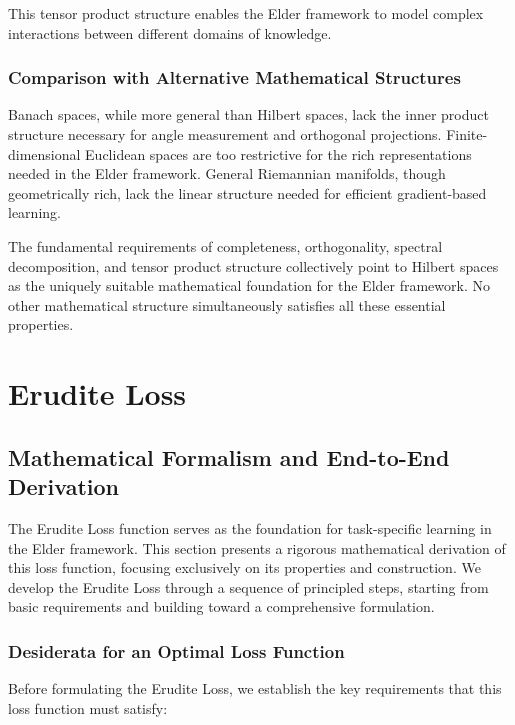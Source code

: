 This tensor product structure enables the Elder framework to model complex interactions between different domains of knowledge.

\subsubsection{Comparison with Alternative Mathematical Structures}

Banach spaces, while more general than Hilbert spaces, lack the inner product structure necessary for angle measurement and orthogonal projections. Finite-dimensional Euclidean spaces are too restrictive for the rich representations needed in the Elder framework. General Riemannian manifolds, though geometrically rich, lack the linear structure needed for efficient gradient-based learning.

The fundamental requirements of completeness, orthogonality, spectral decomposition, and tensor product structure collectively point to Hilbert spaces as the uniquely suitable mathematical foundation for the Elder framework. No other mathematical structure simultaneously satisfies all these essential properties.

\section{Erudite Loss}

\subsection{Mathematical Formalism and End-to-End Derivation}

The Erudite Loss function serves as the foundation for task-specific learning in the Elder framework. This section presents a rigorous mathematical derivation of this loss function, focusing exclusively on its properties and construction. We develop the Erudite Loss through a sequence of principled steps, starting from basic requirements and building toward a comprehensive formulation.

\subsubsection{Desiderata for an Optimal Loss Function}

Before formulating the Erudite Loss, we establish the key requirements that this loss function must satisfy:

